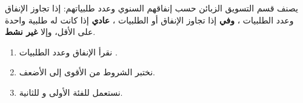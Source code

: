 \begin{statement}
يصنف قسم التسويق الزبائن حسب إنفاقهم السنوي وعدد طلبياتهم: \textbf{} إذا تجاوز الإنفاق  وعدد الطلبيات ، \textbf{وفي} إذا تجاوز الإنفاق  أو الطلبيات ، \textbf{عادي} إذا كانت له طلبية واحدة على الأقل، وإلا \textbf{غير نشط}.
\end{statement}
\begin{stepsbox}\begin{enumerate}
\item نقرأ الإنفاق  وعدد الطلبيات .
\item نختبر الشروط من الأقوى إلى الأضعف.
\item نستعمل \code{\&\&} للفئة الأولى و\code{||} للثانية.
\end{enumerate}\end{stepsbox}
